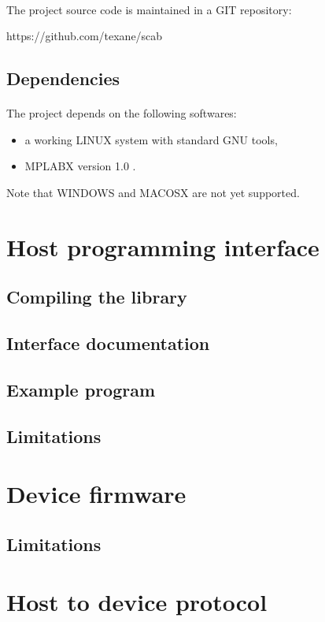 \documentclass[a4paper, 11pt]{article}
\begin{document}
\paragraph{}
The project source code is maintained in a GIT repository:
\begin{center}
https://github.com/texane/scab
\end{center}

\subsection{Dependencies}
\paragraph{}
The project depends on the following softwares:
\begin{itemize}
\item a working LINUX system with standard GNU tools,
\item MPLABX version 1.0 .
\end{itemize}
Note that WINDOWS and MACOSX are not yet supported.


\newpage
\section{Host programming interface}
\subsection{Compiling the library}
\subsection{Interface documentation}
\subsection{Example program}
\subsection{Limitations}


\newpage
\section{Device firmware}
\subsection{Limitations}


\newpage
\section{Host to device protocol}
\end{document}
